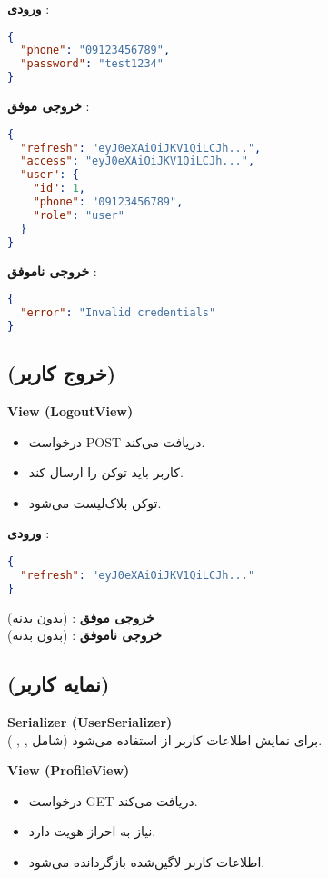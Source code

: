\documentclass{report}
\begin{document}
\textbf{ورودی }:
\begin{lstlisting}[language=json]
{
  "phone": "09123456789",
  "password": "test1234"
}
\end{lstlisting}

\textbf{خروجی موفق }:
\begin{lstlisting}[language=json]
{
  "refresh": "eyJ0eXAiOiJKV1QiLCJh...",
  "access": "eyJ0eXAiOiJKV1QiLCJh...",
  "user": {
    "id": 1,
    "phone": "09123456789",
    "role": "user"
  }
}
\end{lstlisting}

\textbf{خروجی ناموفق }:
\begin{lstlisting}[language=json]
{
  "error": "Invalid credentials"
}
\end{lstlisting}


\subsection{ (خروج کاربر)}
\textbf{View (LogoutView)} \\
\begin{itemize}
  \item درخواست POST دریافت می‌کند.
  \item کاربر باید توکن  را ارسال کند.
  \item توکن بلاک‌لیست می‌شود.
\end{itemize}

\textbf{ورودی }:
\begin{lstlisting}[language=json]
{
  "refresh": "eyJ0eXAiOiJKV1QiLCJh..."
}
\end{lstlisting}

\textbf{خروجی موفق }: (بدون بدنه) \\
\textbf{خروجی ناموفق }: (بدون بدنه)


\subsection{ (نمایه کاربر)}
\textbf{Serializer (UserSerializer)} \\
برای نمایش اطلاعات کاربر از  استفاده می‌شود (شامل , , ).

\textbf{View (ProfileView)} \\
\begin{itemize}
  \item درخواست GET دریافت می‌کند.
  \item نیاز به احراز هویت دارد.
  \item اطلاعات کاربر لاگین‌شده بازگردانده می‌شود.
\end{itemize}
\end{document}
